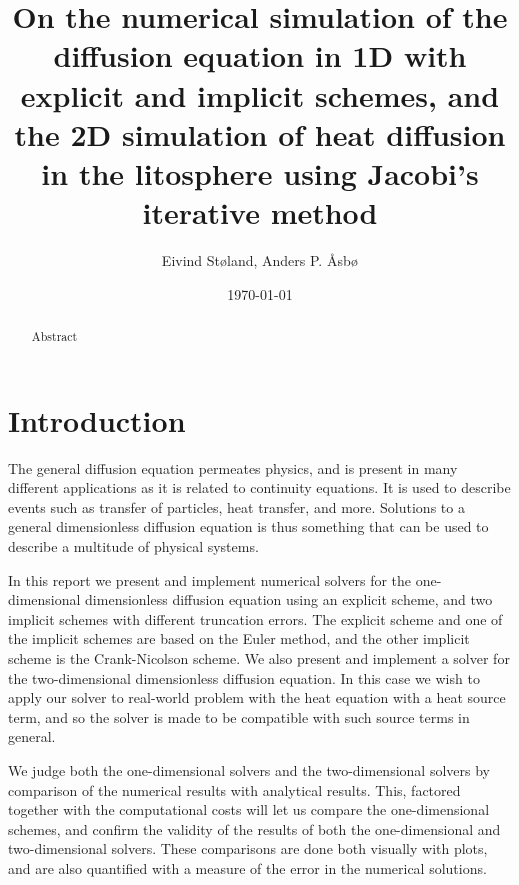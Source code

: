 \documentclass[reprint,english,notitlepage]{revtex4-1}  %
\begin{document}
\title{On the numerical simulation of the diffusion equation in 1D with explicit and implicit schemes, and the 2D simulation of heat diffusion in the litosphere using Jacobi's iterative method}   %
\author{Eivind Støland, Anders P. Åsbø}               %
\date{\today}                             %
\noaffiliation                            %

\begin{abstract}
Abstract
\end{abstract}

\maketitle                                %


\tableofcontents

\section{Introduction} \label{sec:introduction}

The general diffusion equation permeates physics, and is present in many different applications as it is related to continuity equations. It is used to describe events such as transfer of particles, heat transfer, and more. Solutions to a general dimensionless diffusion equation is thus something that can be used to describe a multitude of physical systems. 

In this report we present and implement numerical solvers for the one-dimensional dimensionless diffusion equation using an explicit scheme, and two implicit schemes with different truncation errors. The explicit scheme and one of the implicit schemes are based on the Euler method, and the other implicit scheme is the Crank-Nicolson scheme. We also present and implement a solver for the two-dimensional dimensionless diffusion equation. In this case we wish to apply our solver to real-world problem with the heat equation with a heat source term, and so the solver is made to be compatible with such source terms in general. 

We judge both the one-dimensional solvers and the two-dimensional solvers by comparison of the numerical results with analytical results. This, factored together with the computational costs will let us compare the one-dimensional schemes, and confirm the validity of the results of both the one-dimensional and two-dimensional solvers. These comparisons are done both visually with plots, and are also quantified with a measure of the error in the numerical solutions.
\end{document}

